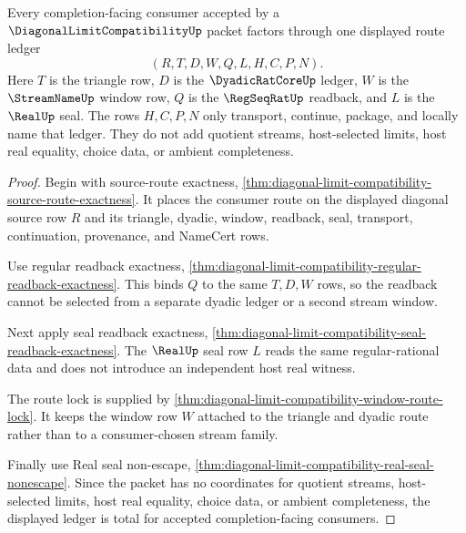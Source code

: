 \begin{theorem}
\label{thm:diagonal-limit-compatibility-route-ledger-totality}
Every completion-facing consumer accepted by a $\DiagonalLimitCompatibilityUp$
packet factors through one displayed route ledger
$$
(R,T,D,W,Q,L,H,C,P,N).
$$
Here $T$ is the triangle row, $D$ is the $\DyadicRatCoreUp$ ledger, $W$ is
the $\StreamNameUp$ window row, $Q$ is the $\RegSeqRatUp$ readback, and $L$
is the $\RealUp$ seal. The rows $H,C,P,N$ only transport, continue, package,
and locally name that ledger. They do not add quotient streams,
host-selected limits, host real equality, choice data, or ambient
completeness.
\end{theorem}
\begin{proof}
Begin with source-route exactness,
\autoref{thm:diagonal-limit-compatibility-source-route-exactness}. It places
the consumer route on the displayed diagonal source row $R$ and its triangle,
dyadic, window, readback, seal, transport, continuation, provenance, and
NameCert rows.

Use regular readback exactness,
\autoref{thm:diagonal-limit-compatibility-regular-readback-exactness}. This
binds $Q$ to the same $T,D,W$ rows, so the readback cannot be selected from a
separate dyadic ledger or a second stream window.

Next apply seal readback exactness,
\autoref{thm:diagonal-limit-compatibility-seal-readback-exactness}. The
$\RealUp$ seal row $L$ reads the same regular-rational data and does not
introduce an independent host real witness.

The route lock is supplied by
\autoref{thm:diagonal-limit-compatibility-window-route-lock}. It keeps the
window row $W$ attached to the triangle and dyadic route rather than to a
consumer-chosen stream family.

Finally use Real seal non-escape,
\autoref{thm:diagonal-limit-compatibility-real-seal-nonescape}. Since the
packet has no coordinates for quotient streams, host-selected limits, host
real equality, choice data, or ambient completeness, the displayed ledger is
total for accepted completion-facing consumers.
\end{proof}

